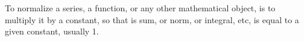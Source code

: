 To normalize a series, a function, or any other mathematical object,
is to multiply it by a constant, so that is sum, or norm, or integral,
etc, is equal to a given constant, usually 1.